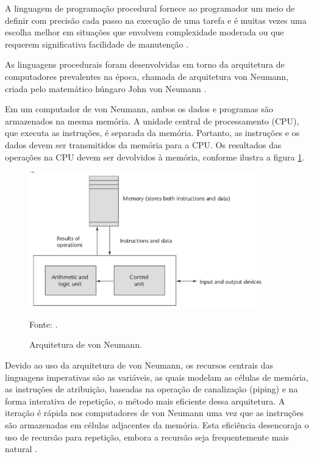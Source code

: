 A linguagem de programação procedural fornece ao programador  um meio de definir com precisão cada passo na execução de uma tarefa e é muitas vezes uma escolha melhor em situações que envolvem complexidade moderada ou que requerem significativa facilidade de manutenção \cite[pág.~22]{paquet2010}.

As linguagens procedurais foram desenvolvidas em torno da arquitetura de computadores prevalentes na época, chamada de  arquitetura von Neumann, criada pelo matemático húngaro John von Neumann \cite[pág.~18]{sebesta2012}.

Em um computador de von Neumann, ambos os dados e programas são armazenados na mesma memória. A unidade central de processamento (CPU), que executa as instruções, é separada da memória. Portanto, as instruções e os dados devem ser transmitidos da memória para a CPU. Os resultados das operações na CPU devem ser devolvidos à memória, conforme ilustra a figura \ref{arquiteturaVon}.

\begin{figure}[H]
\centering
\includegraphics[width=0.9\textwidth]{figuras/arquiteturaVon}
\caption{Arquitetura de von Neumann.}{Fonte: .}
\label{arquiteturaVon}
\end{figure}

Devido ao uso da arquitetura de von Neumann, os recursos centrais das linguagens imperativas são as variáveis, as quais modelam as células de memória, as instruções de atribuição, baseadas na operação de canalização (piping) e na forma interativa de repetição, o método mais eficiente dessa arquitetura. A iteração é rápida nos computadores de von Neumann uma vez que as instruções são armazenadas em células adjacentes da memória. Esta eficiência desencoraja o uso de recursão para repetição, embora a recursão seja frequentemente mais natural \cite[pág.~18]{sebesta2012}.

